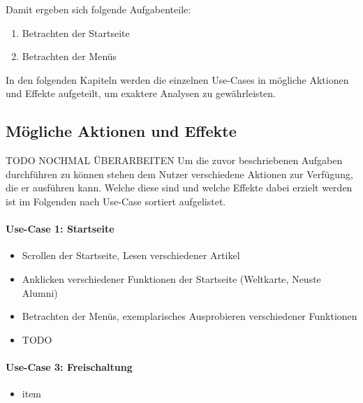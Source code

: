 Damit ergeben sich folgende Aufgabenteile:
\begin{enumerate}
	\item Betrachten der Startseite
	\item Betrachten der Menüs
\end{enumerate}


In den folgenden Kapiteln werden die einzelnen Use-Cases in mögliche Aktionen und Effekte aufgeteilt, um exaktere Analysen zu gewährleisten.

\subsection{Mögliche Aktionen und Effekte}
TODO NOCHMAL ÜBERARBEITEN
Um die zuvor beschriebenen Aufgaben durchführen zu können stehen dem Nutzer verschiedene Aktionen zur Verfügung, die er ausführen kann. Welche diese sind und welche Effekte dabei erzielt werden ist im Folgenden nach Use-Case sortiert aufgelistet.

\paragraph{Use-Case 1: Startseite}
\begin{itemize}
\item Scrollen der Startseite, Lesen verschiedener Artikel
\item Anklicken verschiedener Funktionen der Startseite (Weltkarte, \glqq Neuste Alumni\grqq)
\item Betrachten der Menüs, exemplarisches Ausprobieren verschiedener Funktionen 
\item TODO

\end{itemize}

\paragraph{Use-Case 3: Freischaltung}
\begin{itemize}
\item item

\end{itemize}

